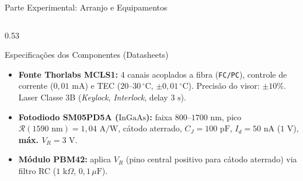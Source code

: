 \documentclass[aspectratio=169, 9pt]{beamer}
\begin{document}
\begin{frame}[shrink=2]{Parte Experimental: Arranjo e Equipamentos}
\begin{center}
  \end{center}
  \vspace{-0.1cm}
  \begin{columns}[T, onlytextwidth]
    \begin{column}{0.53\textwidth}
      \begin{block}{Especificações dos Componentes (Datasheets)}
        \scriptsize
        \begin{itemize}
          \item \textbf{Fonte Thorlabs MCLS1:} 4 canais acoplados a fibra (\texttt{FC/PC}), controle de corrente ($0{,}01\text{ mA}$) e TEC ($20\text{--}30\,^\circ\text{C}$, $\pm 0{,}01\,^\circ\text{C}$). Precisão do visor: $\pm 10\%$. Laser Classe 3B (\textit{Keylock}, \textit{Interlock}, delay $3\text{ s}$).
          \item \textbf{Fotodiodo SM05PD5A ($\text{InGaAs}$):} faixa $800\text{--}1700\text{ nm}$, pico $\mathcal{R}(1590\text{ nm}) = 1{,}04\text{ A/W}$, cátodo aterrado, $C_J = 100\text{ pF}$, $I_d = 50\text{ nA}$ ($1\text{ V}$), \textbf{máx. $V_R = 3\text{ V}$}.
          \item \textbf{Módulo PBM42:} aplica $V_R$ (pino central positivo para cátodo aterrado) via filtro RC ($1\text{ k}\Omega$, $0{,}1\,\mu\text{F}$).
        \end{itemize}
      \end{block}
    \end{column}


\end{columns}
\end{frame}
\end{document}
